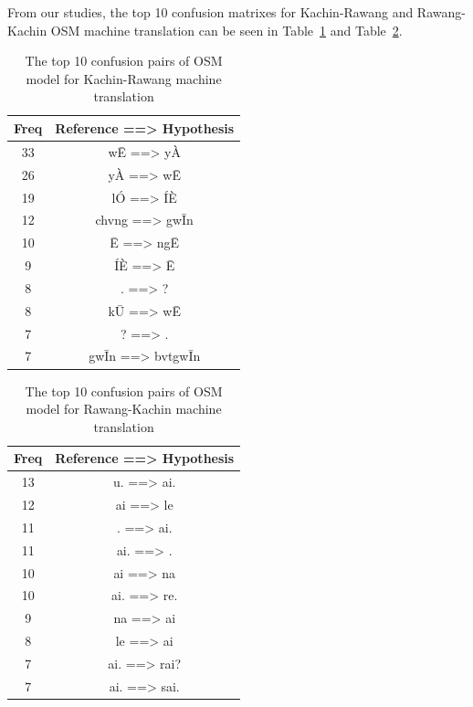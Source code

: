 \documentclass[conference]{IEEEtran}
\begin{document}
From our studies, the top 10 confusion matrixes for Kachin-Rawang and Rawang-Kachin OSM machine translation can be seen in Table~\ref{table:KachinRawangCM} and Table~\ref{table:RawangKachinCM}.

\begin{table}[h!]
\caption{\label{table:KachinRawangCM} The top 10 confusion pairs of OSM model for Kachin-Rawang machine translation}

\begin{center}
\begin{tabular}{ |c|c| } 
 \hline
 \bf Freq & \bf Reference ==> Hypothesis \\ [5pt]
 \hline
 33  & wĒ ==> yÀ \\[5pt]
 \hline
 26  & yÀ ==> wĒ \\[5pt]
 \hline
 19  & lÓ ==> ÍÈ \\[5pt]
 \hline
 12  &  chvng ==> gwĪn\\[5pt]
 \hline
 10  & Ē ==> ngĒ\\[5pt]
 \hline
 9  & ÍÈ ==> Ē\\[5pt]
 \hline
 8  & . ==> ?\\[5pt]
 \hline
 8  & kŪ ==> wĒ\\[5pt]
 \hline
 7  & ? ==> .\\[5pt]
 \hline
 7  & gwĪn ==> bvtgwĪn\\[5pt]
 \hline
\end{tabular}
\end{center}
\end{table}

\begin{table}[h!]
\caption{\label{table:RawangKachinCM} The top 10 confusion pairs of OSM model for Rawang-Kachin machine translation}

\begin{center}
\begin{tabular}{ |c|c| } 
 \hline
 \bf Freq & \bf Reference ==> Hypothesis \\ [5pt]
 \hline
 13  & u. ==> ai. \\[5pt]
 \hline
 12  & ai ==> le \\[5pt]
 \hline
 11  & . ==> ai. \\[5pt]
 \hline
 11  & ai. ==> . \\[5pt]
 \hline
 10  & ai ==> na \\[5pt]
 \hline
 10  & ai. ==> re. \\[5pt]
 \hline
 9  & na ==> ai \\[5pt]
 \hline
 8  & le ==> ai \\[5pt]
 \hline
 7  & ai. ==> rai? \\[5pt]
 \hline
 7  & ai. ==> sai. \\[5pt]
 \hline
\end{tabular}
\end{center}
\end{table}
\end{document}
